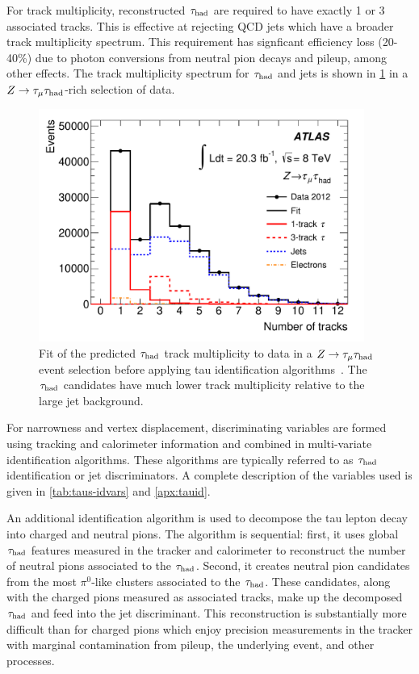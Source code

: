 For track multiplicity, reconstructed $\tau_\text{had}$ are required to have exactly 1 or 3 associated tracks. This is effective at rejecting QCD jets which have a broader track multiplicity spectrum. This requirement has signficant efficiency loss (20-40\%) due to photon conversions from neutral pion decays and pileup, among other effects. The track multiplicity spectrum for $\tau_\text{had}$ and jets is shown in \cref{fig:taus-trackmultiplicity} in a $Z\rightarrow\tau_\mu \tau_\text{had}$-rich selection of data.

\begin{figure}[tp]
  \centering
  \includegraphics[width=0.95\textwidth]{figures/PERF-2013-06/fig_10a}
  \caption{Fit of the predicted $\tau_\text{had}$ track multiplicity to data in a $Z\rightarrow\tau_\mu \tau_\text{had}$ event selection before applying tau identification algorithms~\cite{PERF-2013-06}. The $\tau_\text{had}$ candidates have much lower track multiplicity relative to the large jet background.}
  \label{fig:taus-trackmultiplicity}
\end{figure}

For narrowness and vertex displacement, discriminating variables are formed using tracking and calorimeter information and combined in multi-variate identification algorithms. These algorithms are typically referred to as $\tau_\text{had}$ identification or jet discriminators. A complete description of the variables used is given in \cref{tab:taus-idvars} and \cref{apx:tauid}.

An additional identification algorithm is used to decompose the tau lepton decay into charged and neutral pions. The algorithm is sequential: first, it uses global $\tau_\text{had}$ features measured in the tracker and calorimeter to reconstruct the number of neutral pions associated to the $\tau_\text{had}$. Second, it creates neutral pion candidates from the most $\pi^0$-like clusters associated to the $\tau_\text{had}$. These candidates, along with the charged pions measured as associated tracks, make up the decomposed $\tau_\text{had}$ and feed into the jet discriminant. This reconstruction is substantially more difficult than for charged pions which enjoy precision measurements in the tracker with marginal contamination from pileup, the underlying event, and other processes.

